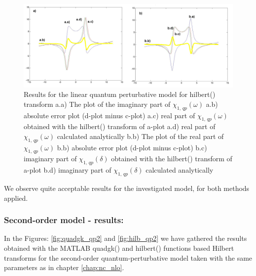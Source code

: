 \documentclass[12pt,twoside,a4paper]{article}
\numberwithin{equation}{subsection}
\numberwithin{figure}{subsection}
\begin{document}
\begin{figure}
  \includegraphics[width=150mm]{img/hilb_qp1.png}
  \caption{Results for the linear quantum perturbative model for hilbert() transform
    a.a) The plot of the imaginary part of ${\chi_{1, \, qp}}(\omega )$
    a.b) absolute error plot (d-plot minus c-plot) 
    a.c) real part of ${\chi_{1, \, qp}}(\omega )$ obtained with the hilbert()  transform of a-plot 
    a.d) real part of ${\chi_{1, \, qp}}(\omega )$ calculated analytically 
    b.b) The plot of the real part of ${\chi_{1, \, qp}}(\omega )$ 
    b.b) absolute error plot (d-plot minus c-plot) 
    b.c) imaginary part of ${\chi_{1, \, qp}}(\delta )$ obtained with the hilbert()  transform of a-plot 
    b.d) imaginary part of ${\chi_{1, \, qp}}(\delta )$ calculated analytically  
    \label{fig:hilb_qp1}
  }
\end{figure}

We observe quite acceptable results for the investigated model, for both methods applied. 

\subsubsection*{Second-order model - results:}

In the Figures: \ref{fig:quadgk_qp2} and \ref{fig:hilb_qp2} we have ga\-thered the results ob\-tained with the MATLAB quadgk() and
hilbert() func\-tions based Hil\-bert transforms for the se\-cond\--order quan\-tum\--per\-tur\-bative model taken with the same
para\-meters as in chapter \ref{chap:nc_nlo}.
\end{document}
